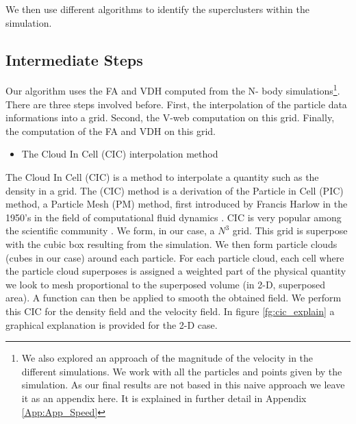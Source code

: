 \documentclass[12pt]{article}
\begin{document}
We then use different algorithms to identify the
 superclusters within the simulation.\\

\subsection{Intermediate Steps} \label{sec:approaches}



\begin{par}

Our algorithm uses the FA and VDH computed from the N-
body simulations\footnote{
We also explored an approach of
 the magnitude of the velocity in the different
  simulations. We work with all the particles and
   points given by the simulation. As our final
    results are not based in this naive approach
     we leave it as an appendix here. It is
      explained in further detail in Appendix
       \ref{App:App_Speed}}. There are three steps involved before.
 First, the interpolation of the particle data
  informations into a grid. Second, the V-web computation
   on this grid. Finally, the computation of the FA and
    VDH on this grid. 
\end{par}


\begin{itemize}
\item The Cloud In Cell (CIC) interpolation method
\end{itemize}
\begin{par}
The Cloud In Cell (CIC) is a method to interpolate a
 quantity such as the density in a grid. The (CIC) method
 is a derivation of the
 Particle in Cell (PIC) method, a Particle Mesh (PM)
  method, first introduced by Francis Harlow in the
   1950's in the field of computational fluid dynamics
    \cite{harlow1964particle}. CIC is very popular
     among the scientific community
      \cite{grigoryev_numerical_2002}. We form, in our
       case, a $N^3$ grid. This grid is superpose with
        the cubic
      box resulting from the simulation. We then form
       particle clouds (cubes in our case) around each
        particle. For each particle cloud, each cell
         where the particle cloud superposes is
          assigned a weighted part of the physical
           quantity we look to mesh proportional to the
            superposed volume (in 2-D, superposed
             area). A function can then be applied to
              smooth the obtained field. We perform
               this CIC
            for the density field and the velocity
             field. In figure \ref{fg:cic_explain} a
              graphical explanation is provided for the
               2-D case.  \\
\end{par}
\end{document}
